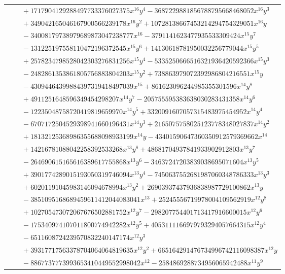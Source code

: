 \documentclass[11pt]{article}
\begin{document}
\begin{longtable}{@{}ll@{}}
 & $\quad +1717904129288497733376027375x^{16}y^{4}-3687229881856788795668468052x^{16}y^{3}$\\
 & $\quad +349042165046167900566239178x^{16}y^{2}+10728138667453214294754329051x^{16}y$\\
 & $\quad -34008179738979689873047238777x^{16}-3791141623477935533309424x^{15}y^{7}$\\
 & $\quad -131225197558110472196372545x^{15}y^{6}+14130618781950032256779044x^{15}y^{5}$\\
 & $\quad +2578234798528042303276831256x^{15}y^{4}-5335250666516321936420592366x^{15}y^{3}$\\
 & $\quad -2482861353861805756883804203x^{15}y^{2}+738863979072392986804216551x^{15}y$\\
 & $\quad -43094464399884397319418497039x^{15}+861623096244985355301596x^{14}y^{8}$\\
 & $\quad +4911251648596349454298207x^{14}y^{7}-205755595383638030283431358x^{14}y^{6}$\\
 & $\quad -12235048758720419819659970x^{14}y^{5}+3320091607057315483975454952x^{14}y^{4}$\\
 & $\quad -6707172504529398941660196431x^{14}y^{3}+2165075758025123778348027837x^{14}y^{2}$\\
 & $\quad +18132125368986355688098933199x^{14}y-43401590647360350912579369662x^{14}$\\
 & $\quad +14216781088042258392533268x^{13}y^{8}+48681704937841933902912803x^{13}y^{7}$\\
 & $\quad -264690615165616389617755868x^{13}y^{6}-34637247203839038695071604x^{13}y^{5}$\\
 & $\quad +3901774289015193050319746094x^{13}y^{4}-7450637552681987060348786333x^{13}y^{3}$\\
 & $\quad +60201191045983146094678994x^{13}y^{2}+26903937437936838987729100862x^{13}y$\\
 & $\quad -3851095168689459611412044083041x^{13}+25245556719978004109562919x^{12}y^{8}$\\
 & $\quad +102705473072067676502881752x^{12}y^{7}-298207754401713417916600015x^{12}y^{6}$\\
 & $\quad -175340974107011800774942282x^{12}y^{5}+4053111166979793294057664315x^{12}y^{4}$\\
 & $\quad -6511608724239570832240147174x^{12}y^{3}$\\
 & $\quad +39317717563378704064064819635x^{12}y^{2}+665164291476734996742116098387x^{12}y$\\
 & $\quad -8867737773993653410449552998042x^{12}-2584869288734956065942488x^{11}y^{9}$\\

\end{longtable}
\end{document}
